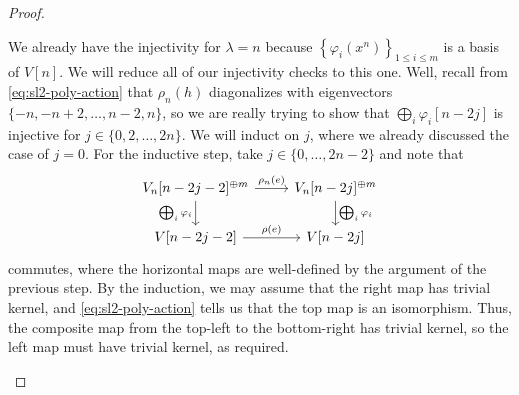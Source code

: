 \documentclass[../notes.tex]{subfiles}
\begin{document}
\begin{proof}
\begin{enumerate}
		We already have the injectivity for $\lambda=n$ because $\left\{\varphi_i\left(x^n\right)\right\}_{1\le i\le m}$ is a basis of $V[n]$. We will reduce all of our injectivity checks to this one. Well, recall from \eqref{eq:sl2-poly-action} that $\rho_n(h)$ diagonalizes with eigenvectors $\{-n,-n+2,\ldots,n-2,n\}$, so we are really trying to show that $\bigoplus_i\varphi_i[n-2j]$ is injective for $j\in\{0,2,\ldots,2n\}$. We will induct on $j$, where we already discussed the case of $j=0$. For the inductive step, take $j\in\{0,\ldots,2n-2\}$ and note that
		\[\begin{tikzcd}
			{V_n[n-2j-2]^{\oplus m}} & {V_n[n-2j]^{\oplus m}} \\
			{V[n-2j-2]} & {V[n-2j]}
			\arrow["{\rho_n(e)}", from=1-1, to=1-2]
			\arrow["{\bigoplus_i\varphi_i}"', from=1-1, to=2-1]
			\arrow["{\bigoplus_i\varphi_i}", from=1-2, to=2-2]
			\arrow["{\rho(e)}", from=2-1, to=2-2]
		\end{tikzcd}\]
		commutes, where the horizontal maps are well-defined by the argument of the previous step. By the induction, we may assume that the right map has trivial kernel, and \eqref{eq:sl2-poly-action} tells us that the top map is an isomorphism. Thus, the composite map from the top-left to the bottom-right has trivial kernel, so the left map must have trivial kernel, as required.
		\qedhere
	\end{enumerate}
\end{proof}
\end{document}

